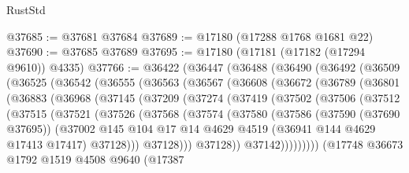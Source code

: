 \begin{lexlean}{RustStd}
\begin{coremodule}
@37685 := @37681 @37684
@37689 := @17180 (@17288 @1768 @1681 @22)
@37690 := @37685 @37689
@37695 := @17180 (@17181 (@17182 (@17294 @9610)) @4335)
@37766 := @36422
    (@36447
      (@36488
        (@36490
          (@36492
            (@36509
              (@36525
                (@36542
                  (@36555
                    (@36563
                      (@36567
                        (@36608
                          (@36672
                            (@36789
                              (@36801
                                (@36883
                                  (@36968
                                    (@37145
                                      (@37209
                                        (@37274
                                          (@37419
                                            (@37502
                                              (@37506
                                                (@37512
                                                  (@37515
                                                    (@37521
                                                      (@37526
                                                        (@37568
                                                          (@37574
                                                            (@37580
                                                              (@37586
                                                                (@37590 (@37690 @37695))
                                                                (@37002
                                                                  @145
                                                                  @104
                                                                  @17
                                                                  @14
                                                                  @4629
                                                                  @4519
                                                                  (@36941 @144 @4629 @17413 @17417)
                                                                  @37128)))
                                                            @37128)))
                                                      @37128))
                                                  @37142)))))))))
                                (@17748
                                  @36673
                                  @1792
                                  @1519
                                  @4508
                                  @9640
                                  (@17387

\end{coremodule}
\end{lexlean}
